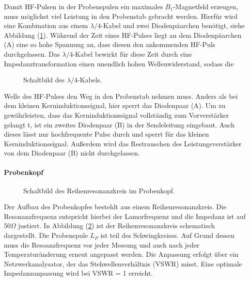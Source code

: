 Damit HF-Pulsen in der Probenspulen ein maximales $B_1$-Magnetfeld erzeugen, muss m\"{o}glichst viel Leistung in den Probenstab gebracht werden.
Hierf\"{u}r wird eine Kombination aus einem $\lambda / 4$-Kabel und zwei Diodenp\"{a}archen ben\"{o}tigt, siehe Abbildung (\ref{lambda4.}).
W\"{a}hrend der Zeit eines HF-Pulses liegt an dem Diodenp\"{a}archen (A) eine so hohe Spannung an, dass diesen den ankommenden HF-Puls durchgelassen.
Das $\lambda /4$-Kabel bewirkt f\"{u}r diese Zeit durch eine Impedanztransformation einen unendlich hohen Wellenwiderstand, sodass die 
\begin{figure}
	\centering
	\caption{Schaltbild des $\lambda / 4$-Kabels.}
	\label{lambda4.}
\end{figure}
Welle des HF-Pulses den Weg in den Probenstab nehmen muss.
Anders als bei dem kleinen Kerninduktionssignal, hier sperrt das Diodenpaar (A).
Um zu gew\"{a}hrleisten, dass das Kerninduk{\-}tions{\-}sig{\-}nal vollst\"{a}ndig zum Vorverst\"{a}rker gelangt t, ist ein zweites Diodenpaar (B) in der Sendeleitung eingebaut.
Auch dieses l\"{a}sst nur hochfrequente Pulse durch und sperrt f\"{u}r das kleinen Kerninduktionssignal.
Au{\ss}erdem wird das Restrauschen des Leistungsverst\"{a}rker von dem Diodenpaar (B) nicht durchgelassen.

\paragraph{Probenkopf}
\begin{figure}
	\centering
	\caption{Schaltbild des Reihenresonanzkreis im Probenkopf.}
	\label{probenkopf.}
\end{figure}
Der Aufbau des Probenkopfes bestehlt aus einem Reihenresonanzkreis.
Die Resonanzfrequenz entspricht hierbei der Lamorfrequenz und die Impedanz ist auf $50 \Omega$ justiert.
In Abbildung (\ref{probenkopf.}) ist der Reihenresonanzkreis schematisch dargestellt.
Die Probenspule $L_P$ ist teil des Schwingkreises.
Auf Grund dessen muss die Resoanzfrequenz vor jeder Messung und auch nach jeder Temperatur\"{a}nderung erneut angepasst werden.
Die Anpassung erfolgt \"{u}ber ein Netzwerkanalysator, der das Stehwellenverhältnis (VSWR) misst.
Eine optimale Impedanzanpassung wird bei VSWR = 1 erreicht.

